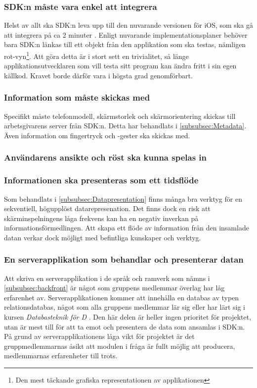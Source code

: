 \subsubsection{SDK:n måste vara enkel att integrera}
Helst av allt ska SDK:n leva upp till den nuvarande versionen för iOS, som ska gå att integrera på ca 2 minuter \parencite{superrec}. Enligt nuvarande implementationsplaner behöver bara SDK:n länkas till ett objekt från den applikation som ska testas, nämligen rot-vyn\footnote{Den mest täckande grafiska representationen av applikationen}. Att göra detta är i stort sett en trivialitet, så länge applikationsutvecklaren som vill testa sitt program kan ändra fritt i sin egen källkod. Kravet borde därför vara i högsta grad genomförbart.

\subsubsection{Information som måste skickas med}
Specifikt måste telefonmodell, skärmstorlek och skärmorientering skickas till arbetsgivarens server från SDK:n. Detta har behandlats i \ref{subsubsec:Metadata}. Även information om fingertryck och -gester ska skickas med. 

\subsubsection{Användarens ansikte och röst ska kunna spelas in}

\subsubsection{Informationen ska presenteras som ett tidsflöde}
Som behandlats i \ref{subsubsec:Datapresentation} finns många bra verktyg för en sekventiell, högupplöst datarepresenation. Det finns dock en risk att skärminspelningens låga frekvens kan ha en negativ inverkan på informationsförmedlingen. Att skapa ett flöde av information från den insamlade datan verkar dock möjligt med befintliga kunskaper och verktyg.

\subsubsection{En serverapplikation som behandlar och presenterar datan}
Att skriva en serverapplikation i de språk och ramverk som nämns i \ref{subsubsec:backfront} är något som gruppens medlemmar överlag har låg erfarenhet av. Serverapplikationen kommer att innehålla en databas av typen relationsdatabas, något som alla gruppens medlemmar lär sig eller har lärt sig i kursen \textit{Databasteknik för D} \parencite{dbas}. Den här delen är heller ingen prioritet för projektet, utan är mest till för att ta emot och presentera de data som ansamlas i SDK:n. På grund av serverapplikationens låga vikt för projektet är det gruppmedlemmarnas åsikt att modulen i fråga är fullt möjlig att producera, medlemmarnas erfarenheter till trots.


